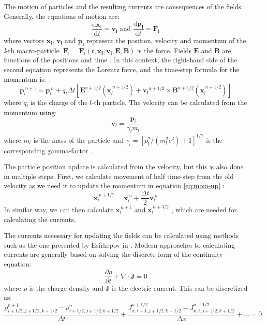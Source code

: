 The motion of particles and the resulting currents are consequences of the fields. Generally, the equations of motion are:
\begin{equation}
	\frac{\mathrm{d}\bm{x_l}}{\mathrm{d}t} = \bm{v_l} \text{   and   }  \frac{\mathrm{d}\bm{p_l}}{\mathrm{d}t} = \bm{F_l}
\end{equation}
where vectors $\bm{x_l}$,  $\bm{v_l}$  and $\bm{p_l}$ represent the position, velocity and momentum of the \textit{l}-th macro-particle. $\bm{F_l}=\bm{F_l}(t,\bm{x_l},\bm{v_l},\bm{E},\bm{B})$ is the force. Fields $\bm{E}$ and $\bm{B}$ are functions of the positions and time \cite{tskhakaya2007}.
In this context, the right-hand side of the second equation represents the Lorentz force, and the time-step formula for the momentum is: \cite{arber2015}:
\begin{equation}
	\bm{p}^{~n+1}_{l} = \bm{p}^{~n}_l + q_l\Delta t \left[\bm{E}^{n+1/2}\left(\bm{x}_l^{~n+1/2}\right)+\bm{v_l}^{n+1/2}\times \bm{B}^{n+1/2}\left(\bm{x}_l^{~n+1/2}\right) \right] 
	\label{eq:mom-up}
\end{equation}
where $q_l$ is the charge of the $l$-th particle. The velocity can be calculated from the momentum using:
\begin{equation}
	\bm{v}_l = \frac{\bm{p}_l}{\gamma_l m_l}
\end{equation}
where $m_l$ is the mass of the particle and $\gamma_l = [p_l^2/(m_l^2 c^2)+1]^{1/2}$ is the corresponding gamma-factor \cite{arber2015}.

The particle position update is calculated from the velocity, but this is also done in multiple steps. First, we calculate movement of half time-step from the old velocity as we need it to update the momentum in equation \ref{eq:mom-up} \cite{arber2015}:
\begin{equation}
	\bm{x}^{~n+1/2}_{l} = \bm{x}^{~n}_l + \frac{\Delta t}{2} \bm{v}^{~n}_l  
\end{equation}
In similar way, we can then calculate $\bm{x}^{~n+1}_l$ and $\bm{x}^{~n+3/2}_l$ \cite{arber2015}, which are needed for calculating the currents.

The currents necessary for updating the fields can be calculated using methods such as the one presented by Esirkepov in \cite{esirkepov2001}. Modern approaches to calculating currents are generally based on solving the discrete form of the continuity equation:
\begin{equation}
	\frac{\partial\rho}{\partial t} + \nabla \cdot \bm{J} = 0
	\label{eq:conti}
\end{equation} 
where $\rho$ is the charge density and $\bm{J}$ is the electric current. This can be discretized as:
\begin{equation}
	\frac{\rho^{n+1}_{i+1/2,j+1/2,k+1/2}-\rho^{n}_{i+1/2,j+1/2,k+1/2}}{\Delta t} + \frac{J^{n+1/2}_{x,i+1,j+1/2,k+1/2}-J^{n+1/2}_{x,i,j+1/2,k+1/2}}{\Delta x} + \dots = 0.
\end{equation}

